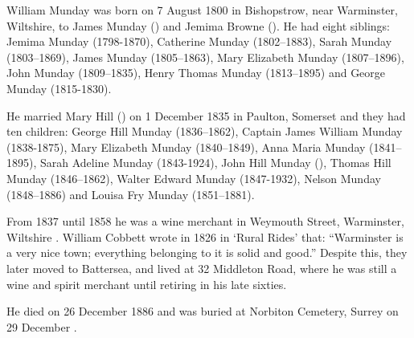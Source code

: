 
William Munday was born on 7 August 1800 \cite{WillMundayBirth} in Bishopstrow, near Warminster, Wiltshire, to James Munday () and Jemima Browne ().  He had eight siblings:  Jemima Munday (1798-1870), Catherine Munday (1802--1883), Sarah Munday (1803--1869), James Munday (1805--1863), Mary Elizabeth Munday (1807--1896), John Munday (1809--1835), Henry Thomas Munday (1813--1895) and George Munday (1815-1830).

He married Mary Hill () on 1 December 1835 in Paulton, Somerset and they had ten children:  George Hill Munday (1836--1862), Captain James William Munday (1838-1875), Mary Elizabeth Munday (1840--1849), Anna Maria Munday (1841--1895), Sarah Adeline Munday (1843-1924), John Hill Munday (), Thomas Hill Munday (1846--1862), Walter Edward Munday (1847-1932), Nelson Munday (1848--1886) and Louisa Fry Munday (1851--1881).

From 1837 until 1858 he was a wine merchant in Weymouth Street, Warminster, Wiltshire \cite{WillMundayOccupation}. William Cobbett wrote in 1826 in `Rural Rides' that: ``Warminster is a very nice town; everything belonging to it is solid and good.'' Despite this, they later moved to Battersea, and lived at 32 Middleton Road, where he was still a wine and spirit merchant until retiring in his late sixties.\cite{WillMundayBattersea}

He died on 26 December 1886 and was buried at Norbiton Cemetery, Surrey on 29 December \cite{WillMundayDeath}.



